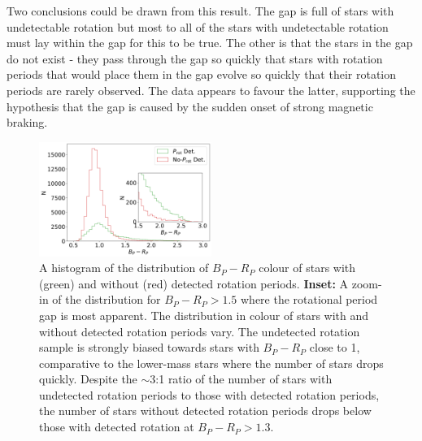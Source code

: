 Two conclusions could be drawn from this result.
The gap is full of stars with undetectable rotation but most to all of the stars with undetectable rotation must lay within the gap for this to be true.
The other is that the stars in the gap do not exist - they pass through the gap so quickly that stars with rotation periods that would place them in the gap evolve so quickly that their rotation periods are rarely observed.
The data appears to favour the latter, supporting the hypothesis that the gap is caused by the sudden onset of strong magnetic braking.

\begin{figure}
\centering
    \includegraphics[width=0.5\textwidth]{Figures/rot_gap_figures/hist_obs.png}
    \caption{A histogram of the distribution of $B_P-R_P$ colour of stars with (green) and without (red) detected rotation periods. \textbf{Inset:} A zoom-in of the distribution for $B_P-R_P>1.5$ where the rotational period gap is most apparent. The distribution in colour of stars with and without detected rotation periods vary. The undetected rotation sample is strongly biased towards stars with $B_P-R_P$ close to 1, comparative to the lower-mass stars where the number of stars drops quickly. Despite the $\sim$3:1 ratio of the number of stars with undetected rotation periods to those with detected rotation periods, the number of stars without detected rotation periods drops below those with detected rotation at $B_P-R_P>1.3$.
    	}
    \label{fig:n_det_nondet}
\end{figure}



